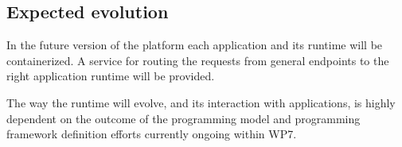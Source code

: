 \subsection{Expected evolution}

In the future version of the platform each application and its runtime will be containerized. A service for routing the requests from general endpoints to the right application runtime will be provided.

The way the runtime will evolve, and its interaction with applications, is highly dependent on the outcome of the programming model and programming framework definition efforts currently ongoing within WP7.